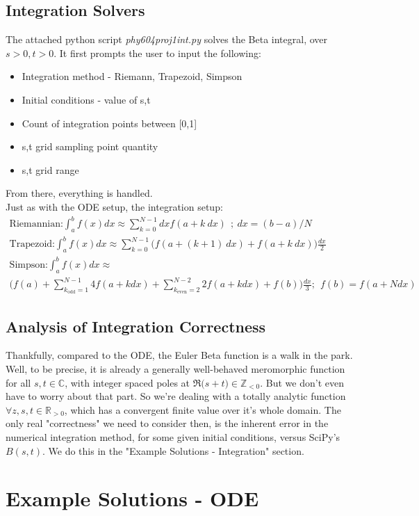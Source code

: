 \documentclass{article}
\begin{document}
\subsection{Integration Solvers}
The attached python script \textit{phy604proj1\textunderscore int.py} solves the Beta integral, over $s>0,t>0$. It first prompts the user to input the following:
\begin{itemize}
    \item Integration method - Riemann, Trapezoid, Simpson
    \item Initial conditions - value of s,t
    \item Count of integration points between [0,1]
    \item s,t grid sampling point quantity
    \item s,t grid range
\end{itemize}
From there, everything is handled. \\
Just as with the ODE setup, the integration setup:
\begin{gather}
    \text{Riemannian:}
    \int_a^b f(x) dx\approx\sum_{k=0}^{N-1} dx f(a+k\:dx) \: \: ;\: dx=(b-a)/N \\
    \text{Trapezoid:}
    \int_a^b f(x)dx \approx\sum_{k=0}^{N-1}\big(f(a+(k+1)\:dx)+f(a+k\:dx)\big)\frac{dx}{2} \\
    \text{Simpson:} \int_a^b f(x)dx\approx  \\
    \big(f(a) +\sum_{k_\text{odd}=1}^{N-1} 4f(a+kdx)+\sum_{k_\text{even}=2}^{N-2} 2f(a+kdx)+f(b)\big)\frac{dx}{3}; \:\: f(b)=f(a+Ndx)
\end{gather}
\subsection{Analysis of Integration Correctness}
Thankfully, compared to the ODE, the Euler Beta function is a walk in the park. Well, to be precise, it is already a generally well-behaved meromorphic function for all $s,t \in \mathbb{C}$, with integer spaced poles at $\Re({s+t)}\in\mathbb{Z}_{<0}$. But we don't even have to worry about that part. So we're dealing with a totally analytic function $\forall z,s,t\in \mathbb{R}_{>0}$, which has a convergent finite value over it's whole domain. The only real "correctness" we need to consider then, is the inherent error in the numerical integration method, for some given initial conditions, versus SciPy's $B(s,t)$. We do this in the "Example Solutions - Integration" section.

\section{Example Solutions - ODE}
\end{document}

